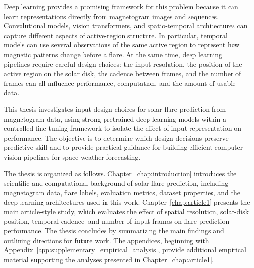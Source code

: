 Deep learning provides a promising framework for this problem because it can learn representations directly from magnetogram images and sequences. Convolutional models, vision transformers, and spatio-temporal architectures can capture different aspects of active-region structure. In particular, temporal models can use several observations of the same active region to represent how magnetic patterns change before a flare. At the same time, deep learning pipelines require careful design choices: the input resolution, the position of the active region on the solar disk, the cadence between frames, and the number of frames can all influence performance, computation, and the amount of usable data.

This thesis investigates input-design choices for solar flare prediction from magnetogram data, using strong pretrained deep-learning models within a controlled fine-tuning framework to isolate the effect of input representation on performance. The objective is to determine which design decisions preserve predictive skill and to provide practical guidance for building efficient computer-vision pipelines for space-weather forecasting.

The thesis is organized as follows. Chapter~\ref{chap:introduction} introduces the scientific and computational background of solar flare prediction, including magnetogram data, flare labels, evaluation metrics, dataset properties, and the deep-learning architectures used in this work. Chapter~\ref{chap:article1} presents the main article-style study, which evaluates the effect of spatial resolution, solar-disk position, temporal cadence, and number of input frames on flare prediction performance. The thesis concludes by summarizing the main findings and outlining directions for future work. The appendices, beginning with Appendix~\ref{app:supplementary_empirical_analysis}, provide additional empirical material supporting the analyses presented in Chapter~\ref{chap:article1}.
